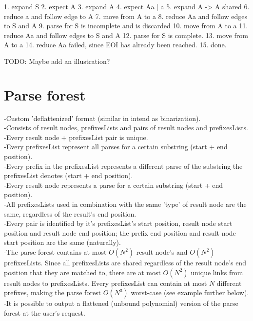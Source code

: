 \documentclass[a4paper,10pt]{article}
\begin{document}
1. expand S
2. expect A
3. expand A
4. expect Aa | a
5. expand A -> A shared
6. reduce a and follow edge to A
7. move from A to a
8. reduce Aa and follow edges to S and A
9. parse for S is incomplete and is discarded
10. move from A to a
11. reduce Aa and follow edges to S and A
12. parse for S is complete.
13. move from A to a
14. reduce Aa failed, since EOI has already been reached.
15. done.

TODO: Maybe add an illustration?\\

\section{Parse forest}

-Custom 'deflattenized' format (similar in intend as binarization).\\
-Consists of result nodes, prefixesLists and pairs of result nodes and prefixesLists.\\
-Every result node + prefixesList pair is unique.\\
-Every prefixesList represent all parses for a certain substring (start + end position).\\
-Every prefix in the prefixesList represents a different parse of the substring the prefixesList denotes (start + end position).\\
-Every result node represents a parse for a certain substring (start + end position).\\
-All prefixesLists used in combination with the same 'type' of result node are the same, regardless of the result's end position.\\
-Every pair is identified by it's prefixesList's start position, result node start position and result node end position; the prefix end position and result node start position are the same (naturally).\\
-The parse forest contains at most $O(N^{2})$ result node's and $O(N^{2})$ prefixesLists. Since all prefixesLists are shared regardless of the result node's end position that they are matched to, there are at most $O(N^{2})$ unique links from result nodes to prefixesLists. Every prefixesList can contain at most $N$ different prefixes, making the parse forest $O(N^{3})$ worst-case (see example further below).\\
-It is possible to output a flattened (unbound polynomial) version of the parse forest at the user's request.\\
\end{document}
